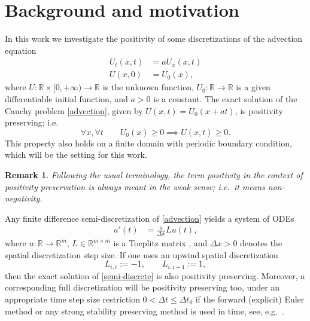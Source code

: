 \documentclass[a4paper]{article}
\newtheorem{remark}{Remark}
\newcommand{\dt}{\Delta t}
\newcommand{\dx}{\Delta x}
\begin{document}
\section{Background and motivation}
In this work we investigate the positivity of some discretizations of the advection equation
\begin{subequations} \label{advection}
\begin{align}
U_t (x,t)& = a U_x(x,t) \\
U(x,0) & = U_0(x),
\end{align}
\end{subequations}
where $U:\mathbb{R}\times [0,+\infty)\to\mathbb{R}$ is the unknown function, $U_0:\mathbb{R}\to\mathbb{R}$ is a given differentiable initial function, and $a>0$ is a constant. 
The exact solution of the Cauchy problem \eqref{advection}, given by $U(x,t) =
U_0(x+a t)$, is positivity preserving; i.e.
\[
\forall x, \forall t\quad\quad U_0(x) \ge 0 \implies U(x,t) \ge 0.
\]
This property also holds on a finite domain with periodic boundary
condition, which will be the setting for this work. 

\begin{remark}
Following the usual terminology, the term {\emph{positivity}} in the context of {positivity preservation} is always meant in the weak sense; i.e.~it means {\emph{non-negativity}}. 
\end{remark}


Any finite difference semi-discretization of \eqref{advection} yields a system of ODEs
\begin{align} \label{semi-discrete}
    u'(t) & = \frac{a}{\dx}Lu(t),
\end{align}
where $u:\mathbb{R}\to\mathbb{R}^m$, $L\in\mathbb{R}^{m\times m}$ is a Toeplitz matrix \cite[Section 3.1]{matmat}, and $\dx>0$ denotes the spatial discretization step size.  
If one uses an upwind spatial discretization
\[
    L_{i,i}  := -1,\quad\quad L_{i,i+1} :=  1,
\]
 then the exact solution of \eqref{semi-discrete} is also positivity
preserving. Moreover, a corresponding full discretization will be positivity preserving too,
under an appropriate time step size restriction $0<\dt\le\dt_0$
if the forward (explicit) Euler method or any strong stability preserving
method \cite{SSPbook} is used in time, see, e.g.~\cite{posconv}.  
\end{document}
